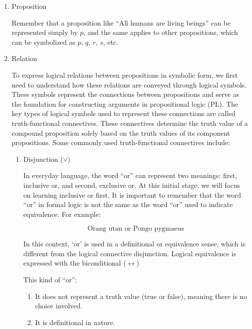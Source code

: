 \begin{enumerate}
\def\labelenumi{\arabic{enumi})}
\item
  Proposition

  Remember that a proposition like ``All humans are living beings'' can
  be represented simply by \(p\), and the same applies to other
  propositions, which can be symbolized as \(p\), \(q\), \(r\), \(s\),
  etc.
\item
  Relation

  To express logical relations between propositions in symbolic form, we
  first need to understand how these relations are conveyed through
  logical symbols. These symbols represent the connections between
  propositions and serve as the foundation for constructing arguments in
  propositional logic (PL). The key types of logical symbols used to
  represent these connections are called truth-functional connectives.
  These connectives determine the truth value of a compound proposition
  solely based on the truth values of its component propositions. Some
  commonly used truth-functional connectives include:

  \begin{enumerate}
  \def\labelenumii{\arabic{enumii})}
  \item
    Disjunction (\(\lor\))

    In everyday language, the word ``or'' can represent two meanings:
    first, inclusive or, and second, exclusive or. At this initial
    stage, we will focus on learning inclusive or first. It is important
    to remember that the word ``or'' in formal logic is not the same as
    the word ``or'' used to indicate equivalence. For example:

    \[
     \text{Orang utan or Pongo pygmaeus}
     \]

    In this context, `or' is used in a definitional or equivalence
    sense, which is different from the logical connective disjunction.
    Logical equivalence is expressed with the biconditional
    (\(\leftrightarrow\))

    This kind of ``or'':

    \begin{enumerate}
    \def\labelenumiii{\alph{enumiii}.}
    \item
      It does not represent a truth value (true or false), meaning there
      is no choice involved.
    \item
      It is definitional in nature.
    \end{enumerate}


\end{enumerate}
\end{enumerate}
